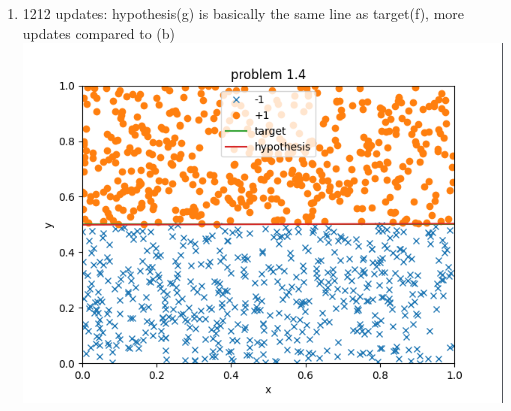\documentclass{article}
\begin{document}
\begin{enumerate}
\begin{enumerate}
            \item 1212 updates: hypothesis(g) is basically the same line as target(f), more updates compared to (b) \\\includegraphics[scale=0.5]{images/e.png}
        \end{enumerate}
    \end{enumerate}
\end{document}
